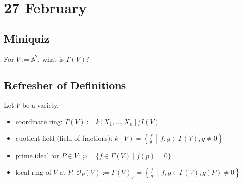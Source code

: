 \documentclass[12pt]{article}
\theoremstyle{definition}
\begin{document}
\section{27 February}
\subsection{Miniquiz}
For $V:=\mathbb{A}^2$, what is $\Gamma(V)$?
\subsection{Refresher of Definitions}
Let $V$ be a variety.
\begin{itemize}
    \item coordinate ring: $\Gamma(V):=k[X_1,\dotsc,X_n]/I(V)$
    \item quotient field (field of fractions): $k(V)=\left\{\frac{f}{g}\,\middle|\,f,g\in\Gamma(V),g\neq0\right\}$
    \item prime ideal for $P\in V$: $\wp=\{f\in\Gamma(V)\mid f(p)=0\}$
    \item local ring of $V$ at $P$: $\mathcal{O}_P(V):=\Gamma(V)_{\wp}=\left\{\frac{f}{g}\,\middle|\,f,g\in\Gamma(V),g(P)\neq0\right\}$
\end{itemize}
\end{document}
